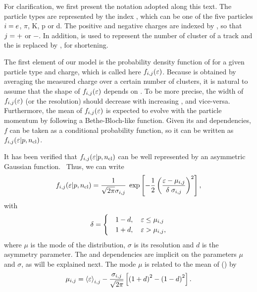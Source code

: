 For clarification, we first present the notation
adopted along this text. The particle types are represented by the index
\ipart, which can be one of the five particles $i=e$, $\pi$, K, p or d.
The positive and negative charges are indexed by
\ich, so that $j = +$ or $-$. In addition, \ncl is used to
represent the number of cluster of a track and the \dedx
is replaced by \eps, for shortening.

The first element of our model is the probability density
function of \eps for a given particle type and charge, which is called
here $f_{i,j}(\mbox{$\varepsilon$})$.
Because \eps is obtained by averaging the measured charge
over a certain number of clusters, it is natural to assume 
that the shape of $f_{i,j}(\mbox{$\varepsilon$})$ depends on \ncl.
To be more precise, the width of $f_{i,j}(\mbox{$\varepsilon$})$
(or the \eps resolution) should decrease
with increasing \ncl, and vice-versa. 
Furthermore, the mean of $f_{i,j}(\mbox{$\varepsilon$})$ is expected  
to evolve with the particle momentum \pp
by following a Bethe-Bloch-like function.
Given its \ncl and \pp dependencies, $f$ can
be taken as a conditional probability function,
so it can be written as $f_{i,j}(\mbox{$\varepsilon$}|p,\mbox{$n_{\text{cl}}$})$.

It has been verified that $f_{i,j}(\mbox{$\varepsilon$}|p,\mbox{$n_{\text{cl}}$})$
can be well represented by an asymmetric
Gaussian function.~\cite{GaborVeresThesis}  
Thus, we can write
\begin{equation}
  f_{i,j}(\mbox{$\varepsilon$}|p,\mbox{$n_{\text{cl}}$}) = \frac{1}{\sqrt{2\pi}\sigma_{i,j}} \;
  \exp\left[-\frac{1}{2}\left(\frac{\mbox{$\varepsilon$}-\mu_{i,j}}{\delta \; \sigma_{i,j}}\right)^2\right],
  \label{eq:hadron:dedx:model:pdf}
\end{equation}
with
\begin{equation}
  \delta =
  \begin{cases}
    & 1-d, \ \ \ \mbox{$\varepsilon$} \le \mu_{i,j} \\
    & 1+d, \ \ \ \mbox{$\varepsilon$} > \mu_{i,j}, \\
  \end{cases}
  \label{eq:hadron:dedx:model:asymm}
\end{equation}
where $\mu$ is the mode of the distribution, $\sigma$ is its resolution
and $d$ is the asymmetry parameter. The \pp and \ncl dependencies are implicit
on the parameters $\mu$ and $\sigma$, as will be explained next.
The mode $\mu$ is related to the mean of \eps (\meaneps) by
\begin{equation}
  \mu_{i,j} = \mbox{$\langle\varepsilon\rangle$}_{i,j} - \frac{\sigma_{i,j}}{\sqrt{2\pi}}
  \left[\left(1+d\right)^2 - \left(1-d\right)^2 \right].
  \label{eq:hadron:dedx:model:mu}
\end{equation}

